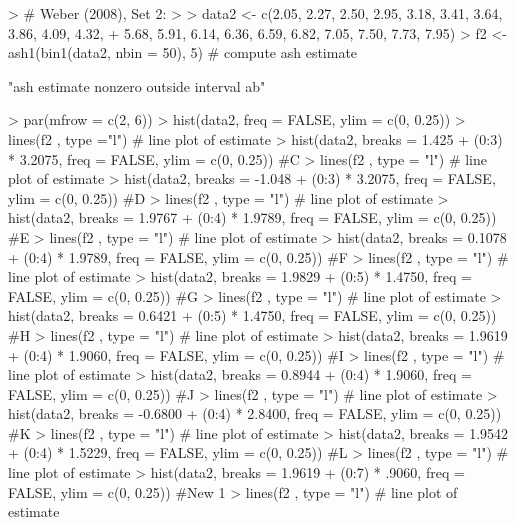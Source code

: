 \begin{Schunk}
\begin{Sinput}
> # Weber (2008), Set 2:
> 
> data2 <- c(2.05, 2.27, 2.50, 2.95, 3.18, 3.41, 3.64, 3.86, 4.09, 4.32,
+   5.68, 5.91, 6.14, 6.36, 6.59, 6.82, 7.05, 7.50, 7.73, 7.95)
> f2 <- ash1(bin1(data2, nbin = 50), 5) # compute ash estimate
\end{Sinput}
\begin{Soutput}
[1] "ash estimate nonzero outside interval ab"
\end{Soutput}
\begin{Sinput}
> par(mfrow = c(2, 6))
> hist(data2, freq = FALSE, ylim = c(0, 0.25))
> lines(f2 , type ="l") # line plot of estimate
> hist(data2, breaks = 1.425 + (0:3) * 3.2075, freq = FALSE, ylim = c(0, 0.25)) #C
> lines(f2 , type = "l") # line plot of estimate
> hist(data2, breaks = -1.048 + (0:3) * 3.2075, freq = FALSE, ylim = c(0, 0.25)) #D
> lines(f2 , type = "l") # line plot of estimate
> hist(data2, breaks = 1.9767 + (0:4) * 1.9789, freq = FALSE, ylim = c(0, 0.25)) #E
> lines(f2 , type = "l") # line plot of estimate
> hist(data2, breaks = 0.1078 + (0:4) * 1.9789, freq = FALSE, ylim = c(0, 0.25)) #F
> lines(f2 , type = "l") # line plot of estimate
> hist(data2, breaks = 1.9829 + (0:5) * 1.4750, freq = FALSE, ylim = c(0, 0.25)) #G
> lines(f2 , type = "l") # line plot of estimate
> hist(data2, breaks = 0.6421 + (0:5) * 1.4750, freq = FALSE, ylim = c(0, 0.25)) #H
> lines(f2 , type = "l") # line plot of estimate
> hist(data2, breaks = 1.9619 + (0:4) * 1.9060, freq = FALSE, ylim = c(0, 0.25)) #I
> lines(f2 , type = "l") # line plot of estimate
> hist(data2, breaks = 0.8944 + (0:4) * 1.9060, freq = FALSE, ylim = c(0, 0.25)) #J
> lines(f2 , type = "l") # line plot of estimate
> hist(data2, breaks = -0.6800 + (0:4) * 2.8400, freq = FALSE, ylim = c(0, 0.25)) #K
> lines(f2 , type = "l") # line plot of estimate
> hist(data2, breaks = 1.9542 + (0:4) * 1.5229, freq = FALSE, ylim = c(0, 0.25)) #L
> lines(f2 , type = "l") # line plot of estimate
> hist(data2, breaks = 1.9619 + (0:7) * .9060, freq = FALSE, ylim = c(0, 0.25)) #New 1
> lines(f2 , type = "l") # line plot of estimate
\end{Sinput}
\end{Schunk}
